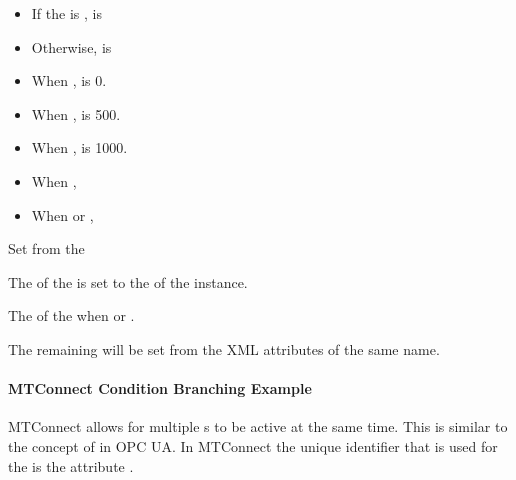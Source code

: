 \begin{description}[font=\it\bfseries,labelindent=4em,labelwidth=6em,leftmargin=!]    
  \item[EnableState]
  \begin{itemize}
    \item If the  is ,  is 
    \item Otherwise,  is 
  \end{itemize}
  \vspace{1em}
  \item[Severity]
  \begin{itemize}
    \item When ,  is 0.
    \item When ,  is 500.
    \item When ,  is 1000.
  \end{itemize}
  \vspace{1em}
  \item[Retain]
  \begin{itemize}
    \item When , 
    \item When  or , 
  \end{itemize}
  \vspace{1em}
  \item[Message] Set from the 
  \item[Time] 
  \item[NodeId] The  of the  is set to the  of the   instance.
  \item[Message] The  of the  when  or .
  \item[\ldots] The remaining  will be set from the XML attributes of the same name.
\end{description}

\paragraph{MTConnect Condition Branching Example}

MTConnect allows for multiple s to be active at the same time. This is similar to the concept of  in OPC UA. In MTConnect the unique identifier that is used for the  is the attribute .

